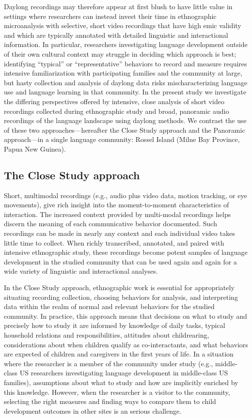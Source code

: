 \documentclass[,man,floatsintext]{apa6}
\begin{document}
Daylong recordings may therefore appear at first blush to have little
value in settings where researchers can instead invest their time in
ethnographic microanalysis with selective, short video recordings that
have high emic validity and which are typically annotated with detailed
linguistic and interactional information. In particular, researchers
investigating language development outside of their own cultural context
may struggle in deciding which approach is best; identifying
\enquote{typical} or \enquote{representative} behaviors to record and
measure requires intensive familiarization with participating families
and the community at large, but hasty collection and analysis of daylong
data risks mischaracterizing language use and language learning in that
community. In the present study we investigate the differing
perspectives offered by intensive, close analysis of short video
recordings collected during ethnographic study and broad, panoramic
audio recordings of the language landscape using daylong methods. We
contrast the use of these two approaches---hereafter the Close Study
approach and the Panoramic approach---in a single language community:
Rossel Island (Milne Bay Province, Papua New Guinea).

\subsection{The Close Study approach}\label{the-close-study-approach}

Short, multimodal recordings (e.g., audio plus video data, motion
tracking, or eye movements), give rich insight into the moment-to-moment
characteristics of interaction. The increased context provided by
multi-modal recordings helps discern the meaning of each communicative
behavior documented. Such recordings can be made in nearly any context
and each individual video takes little time to collect. When richly
transcribed, annotated, and paired with intensive ethnographic study,
these recordings become potent samples of language development in the
studied community that can be used again and again for a wide variety of
linguistic and interactional analyses.

In the Close Study approach, ethnographic work is essential for
appropriately situating recording collection, choosing behaviors for
analysis, and interpreting data within the realm of normal and relevant
behaviors for the studied community. In practice, this approach means
that decisions on what to study and precisely how to study it are
informed by knowledge of daily tasks, typical household relations and
responsibilities, attitudes about childrearing, considerations about
when children qualify as co-interactants, and what behaviors are
expected of children and caregivers in the first years of life. In a
situation where the researcher is a member of the community under study
(e.g., middle-class US researchers investigating language development in
middle-class US families), assumptions about what to study and how are
implicitly enriched by this knowledge. However, when the researcher is a
visitor to the community, selecting the right measures and finding ways
to compare them to child development outcomes in other sites is an
serious challenge.
\end{document}

